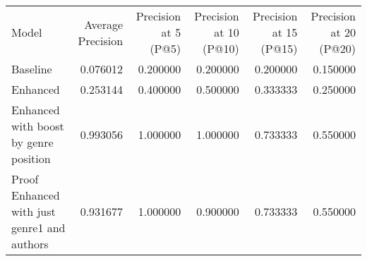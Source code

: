 \begin{tabular}{lrrrrr}
Model & Average Precision & Precision at 5 (P@5) & Precision at 10 (P@10) & Precision at 15 (P@15) & Precision at 20 (P@20) \\
Baseline & 0.076012 & 0.200000 & 0.200000 & 0.200000 & 0.150000 \\
Enhanced & 0.253144 & 0.400000 & 0.500000 & 0.333333 & 0.250000 \\
Enhanced with boost by genre position & 0.993056 & 1.000000 & 1.000000 & 0.733333 & 0.550000 \\
Proof Enhanced with just genre1 and authors & 0.931677 & 1.000000 & 0.900000 & 0.733333 & 0.550000 \\
\end{tabular}
